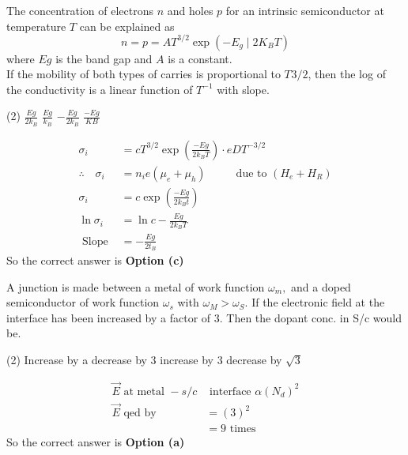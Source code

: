 \begin{exercise}
	The concentration of electrons $n$ and holes $p$ for an intrinsic semiconductor at temperature $T$ can be explained as 
	$$n=p=A T^{3 / 2} \exp \left(-E_{g} \mid 2 K_{B} T\right)$$
	where $Eg$ is the band gap and $A$ is a constant.\\
	If the mobility of both types of carries is proportional to $T^{}3/2$, then the log of the conductivity is a linear function of $T^{-1}$ with slope.
	 \begin{tasks}(2)
		\task[\textbf{a.}]$\frac{E g}{2 k_{B}}$
		\task[\textbf{b.}]$\frac{E g}{k_{B}}$
		\task[\textbf{c.}]$-\frac{E g}{2 k_{B}}$
		\task[\textbf{d.}] $\frac{-E g}{K B}$
	\end{tasks}
\end{exercise}
\begin{answer}
	\begin{align*}
	\sigma_{i}&=c T^{3 / 2} \exp \left(\frac{-E g}{2 k_{B} T}\right) \cdot e D T^{-3 / 2}\\
	\therefore \quad \sigma_{i}&=n_{i} e\left(\mu_{e}+\mu_{h}\right)\hspace{1cm}\text { due to }\left(H_{e}+H_{R}\right)\\
	\sigma_{i}&=c \exp \left(\frac{-E g}{2 k_{B} t}\right)\\
	\ln \sigma_{i}&=\ln c-\frac{E g}{2 k_{B} T}\\
	\text { Slope }&=-\frac{E g}{2 t_{B}}
	\end{align*}
	So the correct answer is \textbf{Option (c)}
\end{answer}
\begin{exercise}
	A junction is made between a metal of work function $\omega_m ,$  and a doped semiconductor of work function $\omega_s$ with $\omega_{M}>\omega_{S} $. If the electronic field at the interface has been increased by a factor of $3$. Then the dopant conc. in S/c would be. 
	\begin{tasks}(2)
		\task[\textbf{a.}]Increase by a
		\task[\textbf{b.}]decrease by 3
		\task[\textbf{c.}]increase by 3
		\task[\textbf{d.}] decrease by $\sqrt{3}$
	\end{tasks}
\end{exercise}
\begin{answer}
	\begin{align*}
	\vec{E} \text { at metal }-s/c &\text { interface } \alpha\left(N_{d}\right)^{2}\\
	\vec{E} \text { qed by } &=(3)^{2} \\
	&=9 \text { times }
	\end{align*}
		So the correct answer is \textbf{Option (a)}
\end{answer}
